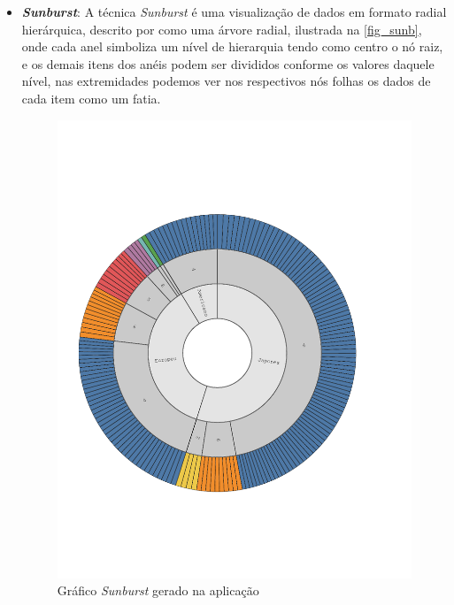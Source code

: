 \documentclass[
	12pt,				%
	openright,			%
	oneside,			%
	a4paper,			%
	english,			%
	brazil				%
	]{abntex2}
\begin{document}
\begin{itemize}
    \item  \textbf{\textit{Sunburst}}:
    A técnica \textit{Sunburst} é uma visualização de dados em formato radial hierárquica, descrito por \cite{Stasko}  como uma árvore radial, ilustrada na \autoref{fig_sunb}, onde cada anel simboliza um nível de hierarquia tendo como centro o nó raiz, e os demais itens dos anéis podem ser divididos conforme os valores daquele nível, nas extremidades podemos ver nos respectivos nós folhas os dados de cada item como um fatia.
    
\begin{figure}
	\caption{\label{fig_sunb} Gráfico \textit{Sunburst} gerado na aplicação}
	\begin{center}
	    \includegraphics[width=40pc,size=1,trim={1cm 50mm, 1.5cm 50mm},clip]{figures/sunb.svg.pdf}
	\end{center}
\end{figure}


\end{itemize}
\end{document}
